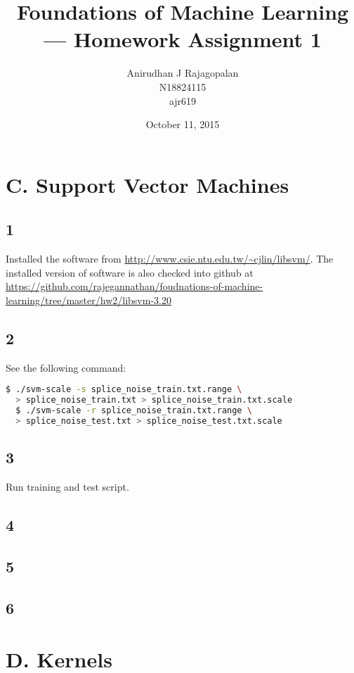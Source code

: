 \documentclass{article}
\begin{document}
\title{Foundations of Machine Learning --- Homework Assignment 1}
\date{October 11, 2015}
\author{Anirudhan J Rajagopalan\\ N18824115\\ ajr619}

\maketitle

\newpage

\section*{C. Support Vector Machines}
\subsection*{1}
Installed the software from \url{http://www.csie.ntu.edu.tw/~cjlin/libsvm/}.  The installed version of software is also checked into github at \url{https://github.com/rajegannathan/foudnations-of-machine-learning/tree/master/hw2/libsvm-3.20}
\subsection*{2}

\noindent See the following command:
\begin{lstlisting}[language=bash]
  $ ./svm-scale -s splice_noise_train.txt.range \ 
  > splice_noise_train.txt > splice_noise_train.txt.scale
  $ ./svm-scale -r splice_noise_train.txt.range \
  > splice_noise_test.txt > splice_noise_test.txt.scale
\end{lstlisting}

\subsection*{3}
Run training and test script\cite{cvscript}.
\subsection*{4}
\subsection*{5}
\subsection*{6}

\section*{D. Kernels}
\end{document}
